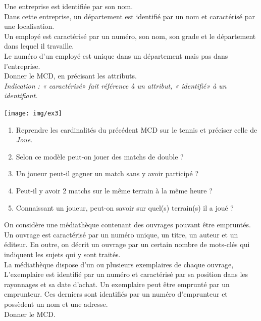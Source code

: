 \documentclass[10pt,firamath,cours]{nsi}
\begin{document}
    
    \begin{exercice}[]
    Une entreprise est identifiée par son nom.\\
    Dans cette entreprise, un département est identifié par un nom et caractérisé par une localisation.\\
    Un employé est caractérisé par un numéro, son nom, son grade et le département dans lequel il travaille.\\
    Le numéro d’un employé est unique dans un département mais pas dans l’entreprise.\\
    Donner le MCD, en précisant les attributs.\\
    
    \textit{Indication : « caractérisé» fait référence à un attribut, « identifié» à un identifiant.}
    \end{exercice}
    
    \begin{exercice}[]
    \begin{center}
    \texttt{[image: img/ex3]}
    \end{center}
    \begin{enumerate}
        \item 	Reprendre les cardinalités du précédent MCD sur le tennis et préciser celle de \textit{Joue}.
        \item 	Selon ce modèle peut-on jouer des matchs de double ?
        \item 	Un joueur peut-il gagner un match sans y avoir participé ?
        \item 	Peut-il y avoir 2 matchs sur le même terrain à la même heure ?
        \item 	Connaissant un joueur, peut-on savoir sur quel(s) terrain(s) il a joué ?
    \end{enumerate}
    \end{exercice}
    
    \begin{exercice}[]
    On considère une médiathèque contenant des ouvrages pouvant être empruntés.\\
    Un ouvrage est caractérisé par un numéro unique, un titre, un auteur et un éditeur. En outre, on décrit un ouvrage par un certain nombre de mots-clés qui indiquent les sujets qui y sont traités.\\
    La médiathèque dispose d’un ou plusieurs exemplaires de chaque ouvrage, L’exemplaire est identifié par un numéro et caractérisé par sa position dans les rayonnages et sa date d’achat.
    Un exemplaire peut être emprunté par un emprunteur. Ces derniers sont identifiés par un numéro d’emprunteur et possèdent un nom et une adresse.\\
    
    Donner le MCD.
    \end{exercice}
    
\end{document}
